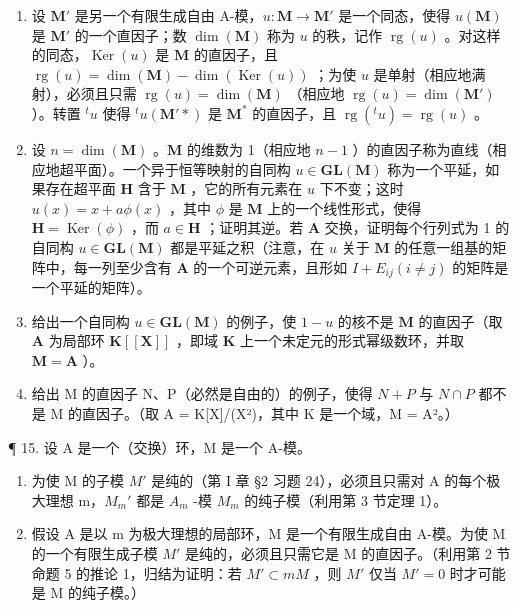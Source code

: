 \begin{enumerate}
\def\labelenumi{(\alph{enumi})}
\item
  设 \(\mathbf{M}'\) 是另一个有限生成自由 A-模，\(u: \mathbf{M} \to \mathbf{M}'\) 是一个同态，使得 \(u(\mathbf{M})\) 是 \(\mathbf{M}'\) 的一个直因子；数 \(\dim(\mathbf{M})\) 称为 \(u\) 的秩，记作 \(\operatorname{rg}(u)\) 。对这样的同态，\(\operatorname{Ker}(u)\) 是 \(\mathbf{M}\) 的直因子，且 \(\operatorname{rg}(u) = \dim(\mathbf{M}) - \dim(\operatorname{Ker}(u))\) ；为使 \(u\) 是单射（相应地满射），必须且只需 \(\operatorname{rg}(u) = \dim(\mathbf{M})\) （相应地 \(\operatorname{rg}(u) = \dim(\mathbf{M}')\) ）。转置 \(^t u\) 使得 \(^t u(\mathbf{M}'*)\) 是 \(\mathbf{M}^*\) 的直因子，且 \(\operatorname{rg}(^t u) = \operatorname{rg}(u)\) 。
\item
  设 \(n = \dim(\mathbf{M})\) 。\(\mathbf{M}\) 的维数为 1（相应地 \(n - 1\) ）的直因子称为直线（相应地超平面）。一个异于恒等映射的自同构 \(u \in \mathbf{GL}(\mathbf{M})\) 称为一个平延，如果存在超平面 \(\mathbf{H}\) 含于 \(\mathbf{M}\) ，它的所有元素在 \(u\) 下不变；这时 \(u(x) = x + a\phi(x)\) ，其中 \(\phi\) 是 \(\mathbf{M}\) 上的一个线性形式，使得 \(\mathbf{H} = \operatorname{Ker}(\phi)\) ，而 \(a \in \mathbf{H}\) ；证明其逆。若 \(\mathbf{A}\) 交换，证明每个行列式为 1 的自同构 \(u \in \mathbf{GL}(\mathbf{M})\) 都是平延之积（注意，在 \(u\) 关于 \(\mathbf{M}\) 的任意一组基的矩阵中，每一列至少含有 \(\mathbf{A}\) 的一个可逆元素，且形如 \(I + E_{ij} (i \neq j)\) 的矩阵是一个平延的矩阵）。
\item
  给出一个自同构 \(u \in \mathbf{GL}(\mathbf{M})\) 的例子，使 \(1 - u\) 的核不是 \(\mathbf{M}\) 的直因子（取 \(\mathbf{A}\) 为局部环 \(\mathbf{K}[[\mathbf{X}]]\) ，即域 \(\mathbf{K}\) 上一个未定元的形式幂级数环，并取 \(\mathbf{M} = \mathbf{A}\) ）。
\item
  给出 M 的直因子 N、P（必然是自由的）的例子，使得 \(N + P\) 与 \(N \cap P\) 都不是 M 的直因子。（取 A = K{[}X{]}/(X²)，其中 K 是一个域，M = A²。）
\end{enumerate}

¶ 15. 设 A 是一个（交换）环，M 是一个 A-模。

\begin{enumerate}
\def\labelenumi{(\alph{enumi})}
\item
  为使 M 的子模 \(M'\) 是纯的（第 I 章 §2 习题 24），必须且只需对 A 的每个极大理想 m，\(M_{m}'\) 都是 \(A_{m}\) -模 \(M_{m}\) 的纯子模（利用第 3 节定理 1）。
\item
  假设 A 是以 m 为极大理想的局部环，M 是一个有限生成自由 A-模。为使 M 的一个有限生成子模 \(M'\) 是纯的，必须且只需它是 M 的直因子。（利用第 2 节命题 5 的推论 1，归结为证明：若 \(M' \subset mM\) ，则 \(M'\) 仅当 \(M' = 0\) 时才可能是 M 的纯子模。）
\end{enumerate}

